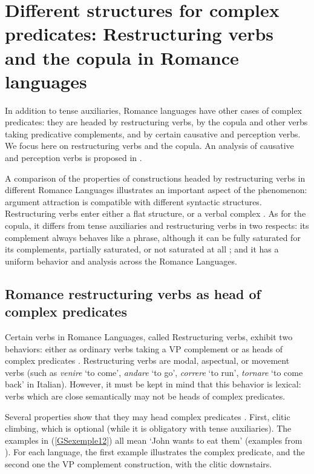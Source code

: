 \documentclass[output=paper
                ,modfonts
                ,nonflat
	        ,collection
	        ,collectionchapter
	        ,collectiontoclongg
 	        ,biblatex
                ,babelshorthands
                ,newtxmath
                ,draftmode
                ,colorlinks, citecolor=brown
]{./langsci/langscibook}
\begin{document}
{\section{Different structures for complex predicates: Restructuring verbs and the copula in Romance languages}\label{GSsection3}

In addition to tense auxiliaries, Romance languages have other cases of complex predicates: they are headed by restructuring verbs, by the copula and other verbs taking predicative complements, and by certain causative and perception verbs. We focus here on restructuring
verbs and the copula. An analysis of causative and perception verbs is proposed in \citep{abeille1995doublestructure, AGMS98a, AG2010}. 

A comparison of the properties of constructions headed by restructuring verbs in different Romance Languages illustrates an important aspect of the phenomenon: argument attraction is compatible with different syntactic structures. Restructuring verbs enter either a flat structure, or a verbal complex \citep{Monachesi98a, abeille2001deux, AG2010}. As for the copula, it differs from tense auxiliaries and restructuring verbs in two respects: its complement always behaves like a phrase, although it can be fully saturated for its complements, partially saturated, or not saturated at all \citep{abeille2001varieties, AG2002b-u}; and it has a uniform behavior and analysis across the Romance Languages.

\subsection{Romance restructuring verbs as head of complex predicates} \label{GSsection3.1}

Certain verbs in Romance Languages, called Restructuring verbs, exhibit two behaviors: either as ordinary verbs taking a VP complement or as heads of complex predicates \citep{rizzi1982issues, aissen1983clause}. Restructuring verbs are modal, aspectual, or movement verbs (such as \emph{venire} `to come’, \emph{andare} `to go’, \emph{correre} `to run’, \emph{tornare} `to come back’ in Italian). However, it must be kept in mind that this behavior is lexical: verbs which are close semantically may not be heads of complex predicates. 

Several properties show that they may head complex predicates \citep{Monachesi98a}. First, clitic climbing, which is optional (while it is obligatory with tense auxiliaries). The examples in (\ref{GSexemple12}) all mean `John wants to eat them’ (examples from \citealt{AG2010}). For each language, the first example illustrates the complex predicate, and the second one the VP complement construction, with the clitic downstairs.

}
\end{document}
